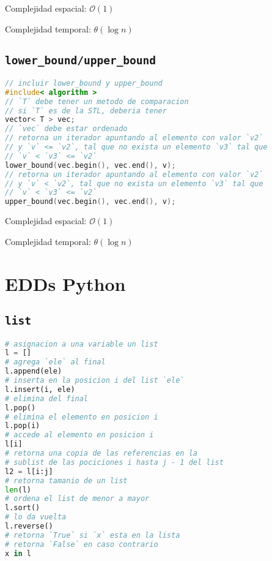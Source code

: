 \documentclass{article}
\newcommand{\bigO}{\mathcal{O}}
\begin{document}
\begin{multicols}{2}
Complejidad espacial: $\bigO(1)$

Complejidad temporal: $\theta(\log n)$

\subsection*{\tt \footnotesize lower\_bound/upper\_bound}
\begin{lstlisting}[language=C++]
// incluir lower_bound y upper_bound
#include< algorithm >
// `T` debe tener un metodo de comparacion
// si `T` es de la STL, deberia tener
vector< T > vec;
// `vec` debe estar ordenado
// retorna un iterador apuntando al elemento con valor `v2`
// y `v` <= `v2`, tal que no exista un elemento `v3` tal que
// `v` < `v3` <= `v2`
lower_bound(vec.begin(), vec.end(), v);
// retorna un iterador apuntando al elemento con valor `v2`
// y `v` < `v2`, tal que no exista un elemento `v3` tal que
// `v` < `v3` <= `v2`
upper_bound(vec.begin(), vec.end(), v);
\end{lstlisting}

Complejidad espacial: $\bigO(1)$

Complejidad temporal: $\theta(\log n)$
\section*{\small EDDs Python}

\subsection*{\tt \footnotesize list}
\begin{lstlisting}[language=Python]
# asignacion a una variable un list
l = []
# agrega `ele` al final
l.append(ele)
# inserta en la posicion i del list `ele`
l.insert(i, ele)
# elimina del final 
l.pop()
# elimina el elemento en posicion i
l.pop(i)
# accede al elemento en posicion i
l[i]
# retorna una copia de las referencias en la 
# sublist de las pociciones i hasta j - 1 del list
l2 = l[i:j]
# retorna tamanio de un list
len(l)
# ordena el list de menor a mayor
l.sort()
# lo da vuelta
l.reverse()
# retorna `True` si `x` esta en la lista
# retorna `False` en caso contrario
x in l
\end{lstlisting}



\end{multicols}
\end{document}
